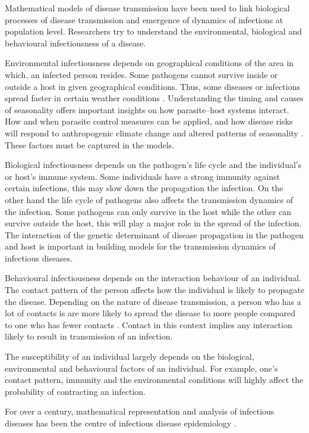 Mathematical models of disease transmission have been used to link biological processes of disease transmission and emergence of dynamics of infections at  population level. Researchers try to understand the environmental, biological and behavioural infectiousness of a disease.

 Environmental infectiousness depends on geographical conditions of the area in which, an  infected person resides. Some pathogens cannot survive inside or outside a host in given geographical  conditions. Thus, some diseases or infections spread faster in certain weather conditions \citep{grass}.
Understanding the timing and causes of seasonality offers important insights on how parasite–host systems interact. How and when parasite control measures can be applied, and how disease risks will respond to anthropogenic climate change and altered patterns of seasonality \citep{altizer}. These factors must be captured in the models.

Biological infectiousness depends on the pathogen's life cycle and the individual's or host's immune system. Some individuals have a strong immunity against certain infections, this may slow down the propagation the infection. On the other hand the life cycle of pathogens also affects the transmission dynamics of the infection. Some pathogens can only survive in the host while the other can survive outside the host, this will play a major role in the spread of the infection. The interaction of the genetic determinant of disease propagation in the pathogen and host is important in building models for the transmission dynamics of infectious diseases.

Behavioural infectiousness depends on the interaction behaviour of an individual. The contact pattern of the person affects how the individual is likely to propagate the disease. Depending on the nature of disease transmission, a person who has a lot of contacts is are more likely to spread the disease to more people compared to one who has fewer contacts \citep{johnson2001sexual}. Contact in this context implies any interaction likely to result in transmission of an infection.

The susceptibility of an individual largely depends on the biological, environmental and behavioural factors of an individual. For example, one's contact pattern, immunity and the environmental conditions will highly affect the probability of contracting an infection.

For over a  century, mathematical representation and analysis of infectious diseases has been  the centre of  infectious disease epidemiology \citep{b2005}.

